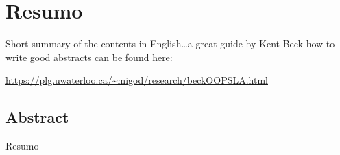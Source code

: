 \begingroup
\let\clearpage\relax
\let\cleardoublepage\relax
\let\cleardoublepage\relax

\chapter*{Resumo}
Short summary of the contents in English\dots a great guide by 
Kent Beck how to write good abstracts can be found here:  
\begin{center}
\url{https://plg.uwaterloo.ca/~migod/research/beckOOPSLA.html}
\end{center}

\vfill

\begin{otherlanguage}{american}
\chapter*{Abstract}
Resumo
\end{otherlanguage}

\endgroup			

\vfill